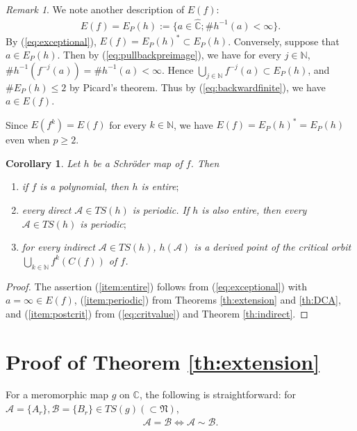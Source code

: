 \documentclass[a4paper,12pt]{amsart}
\theoremstyle{plain}
\newtheorem{corollary}[equation]{Corollary}
\theoremstyle{definition}
\theoremstyle{remark}
\newtheorem{remark}[equation]{Remark}
\numberwithin{equation}{section}
\begin{document}
\begin{remark}
We note another description of $E(f)$: 
 \begin{gather*}
  E(f)=E_P(h):=\{a\in{\hat{\mathbb{C}}};\# h^{-1}(a)<\infty\}.
 \end{gather*} 
 By (\ref{eq:exceptional}), $E(f)=E_P(h)^*\subset E_P(h)$.
 Conversely, suppose that $a\in E_P(h)$. Then by (\ref{eq:pullbackpreimage}), 
 we have for every $j\in{\mathbb{N}}$, $\#h^{-1}(f^{-j}(a))=\# h^{-1}(a)<\infty$.
 Hence $\bigcup_{j\in{\mathbb{N}}}f^{-j}(a)\subset E_P(h)$, and
 $\# E_P(h)\le 2$ by Picard's theorem.
 Thus by (\ref{eq:backwardfinite}), we have $a\in E(f)$.

 Since $E(f^k)=E(f)$ for every $k\in{\mathbb{N}}$,
 we have $E(f)=E_P(h)^*=E_P(h)$ even when $p\ge 2$.
\end{remark}

\begin{corollary}\label{th:postcrit}
Let $h$ be a Schr\"oder map of $f$. Then
\begin{enumerate}
 \item if $f$ is a polynomial, then $h$ is entire$;$
       \label{item:entire}
 \item every direct $\mathcal{A}\in{\mathit{TS}}(h)$ is periodic.
       If $h$ is also entire, then every $\mathcal{A}\in{\mathit{TS}}(h)$ is periodic$;$  
       \label{item:periodic}
 \item for every indirect $\mathcal{A}\in{\mathit{TS}}(h)$,
       $h(\mathcal{A})$ is a derived point of the critical orbit
       $\bigcup_{k\in{\mathbb{N}}}f^k(C(f))$ of $f$.
       \label{item:postcrit}
\end{enumerate}
\end{corollary}

\begin{proof}
 The assertion (\ref{item:entire}) follows from (\ref{eq:exceptional}) 
 with $a=\infty\in E(f)$,
 (\ref{item:periodic}) from Theorems \ref{th:extension} and \ref{th:DCA},
 and (\ref{item:postcrit}) from (\ref{eq:critvalue}) and Theorem \ref{th:indirect}.
\end{proof}

\section{Proof of Theorem \ref{th:extension}}\label{sec:extension}
For a meromorphic map $g$ on ${\mathbb{C}}$, the following is straightforward:
for $\mathcal{A}=\{A_r\},\mathcal{B}=\{B_r\}\in{\mathit{TS}}(g)(\subset\mathfrak{N})$,
\begin{gather}
 \mathcal{A}=\mathcal{B}\Leftrightarrow\mathcal{A}\sim\mathcal{B}.\label{eq:equivalence}
\end{gather}
\end{document}
